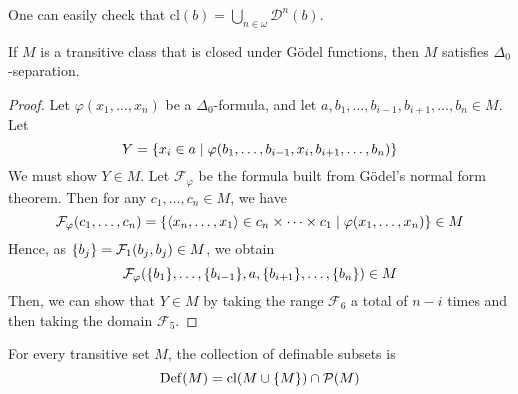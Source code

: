 One can easily check that \( \mathrm{cl}(b) = \bigcup_{n \in \omega} \mathcal D^n(b) \).
\begin{lemma}
    If \( M \) is a transitive class that is closed under G\"odel functions, then \( M \) satisfies \( \Delta_0 \)-separation.
\end{lemma}
\begin{proof}
    Let \( \varphi(x_1, \dots, x_n) \) be a \( \Delta_0 \)-formula, and let \( a, b_1, \dots, b_{i-1}, b_{i+1}, \dots, b_n \in M \).
    Let
    \[ Y = \qty{x_i \in a \mid \varphi(b_1, \dots, b_{i-1}, x_i, b_{i+1}, \dots, b_n)} \]
    We must show \( Y \in M \).
    Let \( \mathcal F_\varphi \) be the formula built from G\"odel's normal form theorem.
    Then for any \( c_1, \dots, c_n \in M \), we have
    \[ \mathcal F_\varphi(c_1, \dots, c_n) = \qty{\langle x_n, \dots, x_1 \rangle \in c_n \times \dots \times c_1 \mid \varphi(x_1, \dots, x_n)} \in M \]
    Hence, as \( \qty{b_j} = \mathcal F_1(b_j, b_j) \in M \), we obtain
    \[ \mathcal F_\varphi(\qty{b_1}, \dots, \qty{b_{i-1}}, a, \qty{b_{i+1}}, \dots, \qty{b_n}) \in M \]
    Then, we can show that \( Y \in M \) by taking the range \( \mathcal F_6 \) a total of \( n - i \) times and then taking the domain \( \mathcal F_5 \).
\end{proof}
\begin{theorem}
    For every transitive set \( M \), the collection of definable subsets is
    \[ \operatorname{Def}(M) = \mathrm{cl}(M \cup \qty{M}) \cap \mathcal P(M) \]
\end{theorem}
